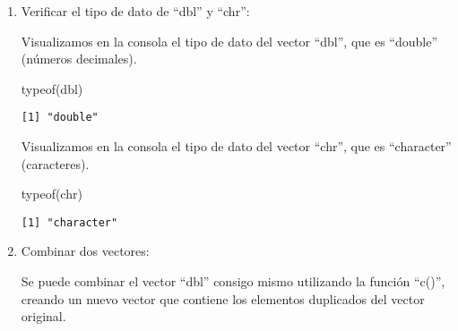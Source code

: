 \documentclass[
  a4paper,
]{article}
\newenvironment{Shaded}{}{}
\newcommand{\FunctionTok}[1]{\textcolor[rgb]{0.44,0.26,0.76}{#1}}
\newcommand{\NormalTok}[1]{\textcolor[rgb]{0.14,0.16,0.18}{#1}}
\begin{document}
\begin{enumerate}
  Calculamos y mostramos en la consola la longitud del vector ``dbl'',
  que es 3.

\begin{Shaded}
\begin{Highlighting}[]
\FunctionTok{length}\NormalTok{(dbl)}
\end{Highlighting}
\end{Shaded}

\begin{verbatim}
[1] 3
\end{verbatim}

  Calculamos y mostramos en la consola la longitud del vector ``chr'',
  que es 3.

\begin{Shaded}
\begin{Highlighting}[]
\FunctionTok{length}\NormalTok{(chr)}
\end{Highlighting}
\end{Shaded}

\begin{verbatim}
[1] 3
\end{verbatim}
\item
  Verificar el tipo de dato de ``dbl'' y ``chr'':

  Visualizamos en la consola el tipo de dato del vector ``dbl'', que es
  ``double'' (números decimales).

\begin{Shaded}
\begin{Highlighting}[]
\FunctionTok{typeof}\NormalTok{(dbl)}
\end{Highlighting}
\end{Shaded}

\begin{verbatim}
[1] "double"
\end{verbatim}

  Visualizamos en la consola el tipo de dato del vector ``chr'', que es
  ``character'' (caracteres).

\begin{Shaded}
\begin{Highlighting}[]
\FunctionTok{typeof}\NormalTok{(chr)}
\end{Highlighting}
\end{Shaded}

\begin{verbatim}
[1] "character"
\end{verbatim}
\item
  Combinar dos vectores:

  Se puede combinar el vector ``dbl'' consigo mismo utilizando la
  función ``c()'', creando un nuevo vector que contiene los elementos
  duplicados del vector original.


\end{enumerate}
\end{document}
